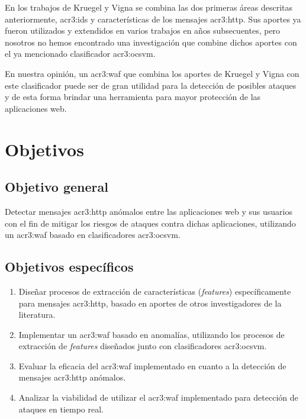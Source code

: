 En los trabajos de Kruegel y Vigna se combina las dos primeras áreas
descritas anteriormente, \gls{acr3:ids} y características de los mensajes
\gls{acr3:http}. Sus aportes ya fueron utilizados y extendidos en varios
trabajos en años subsecuentes, pero nosotros no hemos encontrado una
investigación que combine dichos aportes con el ya mencionado clasificador
\gls{acr3:ocsvm}.

En nuestra opinión, un \gls{acr3:waf} que combina los aportes de Kruegel
y Vigna con este clasificador puede ser de gran utilidad para la detección
de posibles ataques y de esta forma brindar una herramienta para mayor
protección de las aplicaciones web.


\section{Objetivos}

\subsection{Objetivo general}

Detectar mensajes \gls{acr3:http} anómalos entre las aplicaciones web
y sus usuarios con el fin de mitigar los riesgos de ataques contra dichas
aplicaciones, utilizando un \gls{acr3:waf} basado en clasificadores
\gls{acr3:ocsvm}.


\subsection{Objetivos específicos}

\begin{enumerate}
    \item
    Diseñar procesos de extracción de características (\textit{features})
    específicamente para mensajes \gls{acr3:http}, basado en aportes de
    otros investigadores de la literatura.

    \item
    Implementar un \gls{acr3:waf} basado en anomalías, utilizando los
    procesos de extracción de \textit{features} diseñados junto con
    clasificadores \gls{acr3:ocsvm}.

    \item
    Evaluar la eficacia del \gls{acr3:waf} implementado en cuanto a la
    detección de mensajes \gls{acr3:http} anómalos.

    \item
    Analizar la viabilidad de utilizar el \gls{acr3:waf} implementado
    para detección de ataques en tiempo real.
\end{enumerate}



